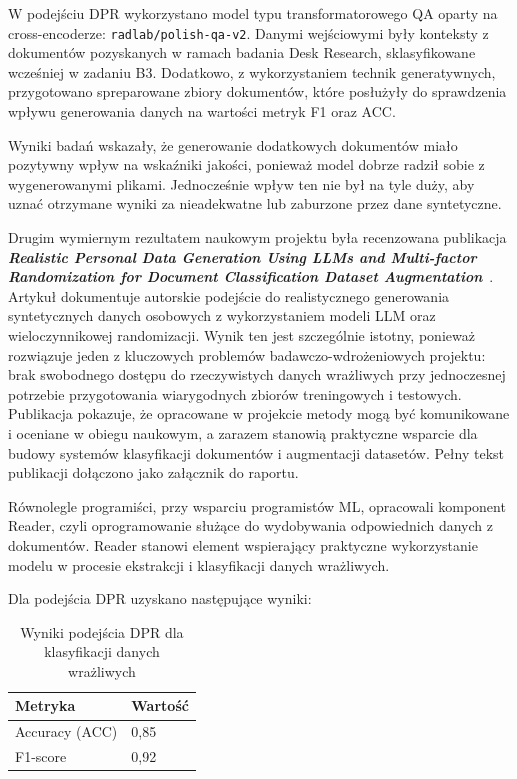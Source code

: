 \documentclass[12pt,a4paper]{report}
\begin{document}
W podejściu DPR wykorzystano model typu transformatorowego QA oparty na cross-encoderze: \texttt{radlab/polish-qa-v2}. Danymi wejściowymi były konteksty z dokumentów pozyskanych w ramach badania Desk Research, sklasyfikowane wcześniej w zadaniu B3. Dodatkowo, z wykorzystaniem technik generatywnych, przygotowano spreparowane zbiory dokumentów, które posłużyły do sprawdzenia wpływu generowania danych na wartości metryk F1 oraz ACC.

Wyniki badań wskazały, że generowanie dodatkowych dokumentów miało pozytywny wpływ na wskaźniki jakości, ponieważ model dobrze radził sobie z wygenerowanymi plikami. Jednocześnie wpływ ten nie był na tyle duży, aby uznać otrzymane wyniki za nieadekwatne lub zaburzone przez dane syntetyczne.

Drugim wymiernym rezultatem naukowym projektu była recenzowana publikacja \textit{\textbf{Realistic Personal Data Generation Using LLMs and Multi-factor Randomization for Document Classification Dataset Augmentation}}~\cite{legumina2025realisticpersonaldata}. Artykuł dokumentuje autorskie podejście do realistycznego generowania syntetycznych danych osobowych z wykorzystaniem modeli LLM oraz wieloczynnikowej randomizacji. Wynik ten jest szczególnie istotny, ponieważ rozwiązuje jeden z kluczowych problemów badawczo-wdrożeniowych projektu: brak swobodnego dostępu do rzeczywistych danych wrażliwych przy jednoczesnej potrzebie przygotowania wiarygodnych zbiorów treningowych i testowych. Publikacja pokazuje, że opracowane w projekcie metody mogą być komunikowane i oceniane w obiegu naukowym, a zarazem stanowią praktyczne wsparcie dla budowy systemów klasyfikacji dokumentów i augmentacji datasetów. Pełny tekst publikacji dołączono jako załącznik do raportu.

Równolegle programiści, przy wsparciu programistów ML, opracowali komponent Reader, czyli oprogramowanie służące do wydobywania odpowiednich danych z dokumentów. Reader stanowi element wspierający praktyczne wykorzystanie modelu w procesie ekstrakcji i klasyfikacji danych wrażliwych.

Dla podejścia DPR uzyskano następujące wyniki:

\begin{table}[h]
    \centering
    \caption{Wyniki podejścia DPR dla klasyfikacji danych wrażliwych}
    \begin{tabular}{l l}
        \toprule
        Metryka & Wartość \\
        \midrule
        Accuracy (ACC) & 0{,}85 \\
        F1-score & 0{,}92 \\
        \bottomrule
    \end{tabular}
\end{table}
\end{document}
